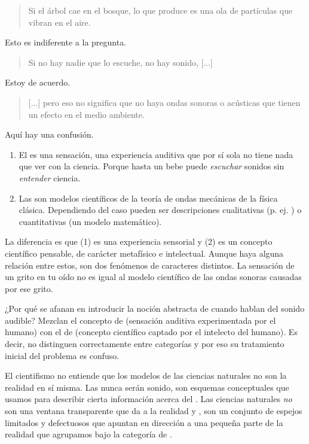 \documentclass[12pt]{article}
\begin{document}
	\blockquote[]{Si el árbol cae en el bosque, lo que produce es una ola de
	partículas que vibran en el aire.}
	
	Esto es indiferente a la pregunta.
	
	\blockquote[]{Si no hay nadie que lo escuche, no hay sonido, [...]}

	Estoy de acuerdo.

	\blockquote[]{[...] pero eso no significa que no haya ondas sonoras o
	acústicas que tienen un efecto en el medio ambiente.}
	
	Aquí hay una confusión.

	\begin{enumerate}
	\item El  es una sensación, una experiencia auditiva
		que por sí sola no tiene nada que ver con la ciencia. Porque
			hasta un bebe puede \textit{escuchar} sonidos sin
			\textit{entender} ciencia.
	
	\item Las  son modelos científicos
		de la teoría de ondas mecánicas de la física clásica.
		Dependiendo del caso pueden ser descripciones cualitativas (p.
		ej. ) o
		cuantitativas (un modelo matemático).
	\end{enumerate}

	La diferencia es que (1) es una experiencia sensorial y (2) es un
	concepto científico pensable, de carácter metafísico e intelectual.
	Aunque haya alguna relación entre estos, son dos fenómenos de caracteres
	distintos. La sensación de un grito en tu oído no es igual al modelo
	científico de las ondas sonoras causadas por ese grito.
	
	¿Por qué se afanan en introducir la noción abstracta de  cuando hablan del sonido audible? Mezclan el concepto de
	 (sensación auditiva experimentada por el humano) con
	el de  (concepto científico captado por el
	intelecto del humano). Es decir, no distinguen correctamente entre
	categorías y por eso su tratamiento inicial del problema es confuso.
	
	El cientifismo no entiende que los modelos de las ciencias naturales no
	son la realidad en sí misma. Las  nunca serán
	sonido, son esquemas conceptuales que usamos para describir cierta
	información acerca del . Las ciencias naturales
	\textit{no} son una ventana transparente que da a la realidad
	 y , son un conjunto de espejos
	limitados y defectuosos que apuntan en dirección a una pequeña parte de
	la realidad que agrupamos bajo la categoría de .
	
\end{document}
